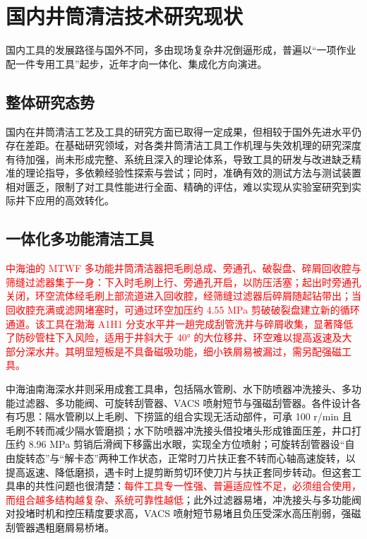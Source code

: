 \section{国内井筒清洁技术研究现状}

国内工具的发展路径与国外不同，多由现场复杂井况倒逼形成，普遍以“一项作业配一件专用工具”起步，近年才向一体化、集成化方向演进。

\subsection{整体研究态势}

国内在井筒清洁工艺及工具的研究方面已取得一定成果，但相较于国外先进水平仍存在差距。在基础研究领域，对各类井筒清洁工具工作机理与失效机理的研究深度有待加强，尚未形成完整、系统且深入的理论体系，导致工具的研发与改进缺乏精准的理论指导，多依赖经验性探索与尝试；同时，准确有效的测试方法与测试装置相对匮乏，限制了对工具性能进行全面、精确的评估，难以实现从实验室研究到实际井下应用的高效转化。

\subsection{一体化多功能清洁工具}

\textcolor{red}{中海油的 MTWF 多功能井筒清洁器把毛刷总成、旁通孔、破裂盘、碎屑回收腔与筛缝过滤器集于一身：下入时毛刷上行、旁通孔开启，以防压活塞；起出时旁通孔关闭，环空流体经毛刷上部流道进入回收腔，经筛缝过滤器后碎屑随起钻带出；\textcolor{red}{当回收腔充满或滤网堵塞时，可通过环空加压约 4.55 MPa 剪破破裂盘建立新的循环通道}。该工具在渤海 A1H1 分支水平井一趟完成刮管洗井与碎屑收集，显著降低了防砂管柱下入风险，适用于井斜大于 40° 的大位移井、环空难以提高返速及大部分深水井。其明显短板是不具备磁吸功能，细小铁屑易被漏过，需另配强磁工具。}

中海油南海深水井则采用成套工具串，包括隔水管刷、水下防喷器冲洗接头、多功能过滤器、多功能阀、可旋转刮管器、VACS 喷射短节与强磁刮管器。各件设计各有巧思：隔水管刷以上毛刷、下捞篮的组合实现无活动部件，可承 100 r/min 且毛刷不转而减少隔水管磨损；水下防喷器冲洗接头借投堵头形成锥面压差，井口打压约 8.96 MPa 剪销后滑阀下移露出水眼，实现全方位喷射；可旋转刮管器设“自由旋转态”与“解卡态”两种工作状态，正常时刀片扶正套不转而心轴高速旋转，以提高返速、降低磨损，遇卡时上提剪断剪切环使刀片与扶正套同步转动。但这套工具串的共性问题也很清楚：\textcolor{red}{每件工具专一性强、普遍适应性不足，必须组合使用，而组合越多结构越复杂、系统可靠性越低}；此外过滤器易堵，冲洗接头与多功能阀对投堵时机和控压精度要求高，VACS 喷射短节易堵且负压受深水高压削弱，强磁刮管器遇粗磨屑易桥堵。

